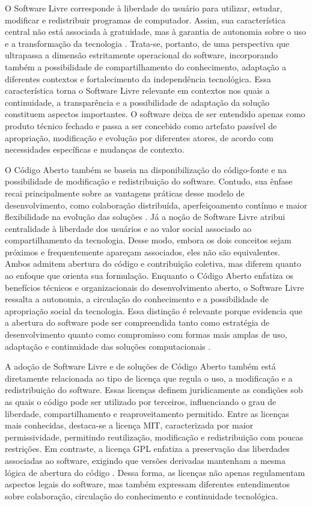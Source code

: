 O Software Livre corresponde à liberdade do usuário para utilizar, estudar, modificar e redistribuir programas de computador. Assim, sua característica central não está associada à gratuidade, mas à garantia de autonomia sobre o uso e a transformação da tecnologia \cite{silveira2004,gnu2026,fsf2026}. Trata-se, portanto, de uma perspectiva que ultrapassa a dimensão estritamente operacional do software, incorporando também a possibilidade de compartilhamento do conhecimento, adaptação a diferentes contextos e fortalecimento da independência tecnológica. Essa característica torna o Software Livre relevante em contextos nos quais a continuidade, a transparência e a possibilidade de adaptação da solução constituem aspectos importantes. O software deixa de ser entendido apenas como produto técnico fechado e passa a ser concebido como artefato passível de apropriação, modificação e evolução por diferentes atores, de acordo com necessidades específicas e mudanças de contexto.

O Código Aberto também se baseia na disponibilização do código-fonte e na possibilidade de modificação e redistribuição do software. Contudo, sua ênfase recai principalmente sobre as vantagens práticas desse modelo de desenvolvimento, como colaboração distribuída, aperfeiçoamento contínuo e maior flexibilidade na evolução das soluções \cite{osi2026,mockus2000,scotto2007,lonchamp2005,maccormack2006}. Já a noção de Software Livre atribui centralidade à liberdade dos usuários e ao valor social associado ao compartilhamento da tecnologia.
Desse modo, embora os dois conceitos sejam próximos e frequentemente apareçam associados, eles não são equivalentes. Ambos admitem abertura do código e contribuição coletiva, mas diferem quanto ao enfoque que orienta sua formulação. Enquanto o Código Aberto enfatiza os benefícios técnicos e organizacionais do desenvolvimento aberto, o Software Livre ressalta a autonomia, a circulação do conhecimento e a possibilidade de apropriação social da tecnologia. Essa distinção é relevante porque evidencia que a abertura do software pode ser compreendida tanto como estratégia de desenvolvimento quanto como compromisso com formas mais amplas de uso, adaptação e continuidade das soluções computacionais \cite{silveira2004,gnu2026,osi2026}.

A adoção de Software Livre e de soluções de Código Aberto também está diretamente relacionada ao tipo de licença que regula o uso, a modificação e a redistribuição do software. Essas licenças definem juridicamente as condições sob as quais o código pode ser utilizado por terceiros, influenciando o grau de liberdade, compartilhamento e reaproveitamento permitido. Entre as licenças mais conhecidas, destaca-se a licença MIT, caracterizada por maior permissividade, permitindo reutilização, modificação e redistribuição com poucas restrições. Em contraste, a licença GPL enfatiza a preservação das liberdades associadas ao software, exigindo que versões derivadas mantenham a mesma lógica de abertura do código \cite{silveira2004,gnu2026}. Dessa forma, as licenças não apenas regulamentam aspectos legais do software, mas também expressam diferentes entendimentos sobre colaboração, circulação do conhecimento e continuidade tecnológica.

